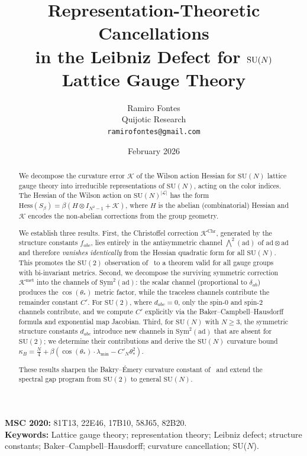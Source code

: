 \documentclass[11pt,a4paper]{article}
\title{Representation-Theoretic Cancellations\\
in the Leibniz Defect for $\SU(N)$\\
Lattice Gauge Theory}
\author{Ramiro Fontes\\
Quijotic Research\\
\texttt{ramirofontes@gmail.com}}
\date{February 2026}
\theoremstyle{plain}
\theoremstyle{definition}
\theoremstyle{remark}
\newcommand{\SU}{\mathrm{SU}}
\newcommand{\Hess}{\mathrm{Hess}}
\newcommand{\ad}{\mathrm{ad}}
\newcommand{\Sym}{\mathrm{Sym}}
\newcommand{\cK}{\mathcal{K}}
\newcommand{\cL}{\mathcal{L}}
\begin{document}
\maketitle

\begin{abstract}
We decompose the curvature error $\cK$ of the Wilson action
Hessian for $\SU(N)$ lattice gauge theory into irreducible
representations of $\SU(N)$, acting on the color indices. The
Hessian of the Wilson action on $\SU(N)^{|\cL|}$ has the form
$\Hess(S_\beta) = \beta(H \otimes I_{N^2-1} + \cK)$, where $H$
is the abelian (combinatorial) Hessian and $\cK$ encodes the
non-abelian corrections from the group geometry.

We establish three results. First, the Christoffel correction
$\cK^{\mathrm{Chr}}$, generated by the structure constants
$f_{abc}$, lies entirely in the antisymmetric channel
$\bigwedge^2(\ad)$ of $\ad \otimes \ad$ and therefore
\emph{vanishes identically} from the Hessian quadratic form for
all $\SU(N)$. This promotes the $\SU(2)$ observation
of~\cite{Fontes2026Paper8} to a theorem valid for all gauge
groups with bi-invariant metrics. Second, we decompose the
surviving symmetric correction $\cK^{\mathrm{met}}$ into the
channels of $\Sym^2(\ad)$: the scalar channel (proportional to
$\delta_{ab}$) produces the $\cos(\theta_*)$ metric factor, while
the traceless channels contribute the remainder constant $C'$.
For $\SU(2)$, where $d_{abc} = 0$, only the spin-$0$ and spin-$2$
channels contribute, and we compute $C'$ explicitly via the
Baker--Campbell--Hausdorff formula and exponential map Jacobian.
Third, for $\SU(N)$ with $N \geq 3$, the symmetric structure
constants $d_{abc}$ introduce new channels in $\Sym^2(\ad)$ that
are absent for $\SU(2)$; we determine their contributions and
derive the $\SU(N)$ curvature bound
$\kappa_B = \frac{N}{4} + \beta(\cos(\theta_*) \cdot
\lambda_{\min} - C'_N\theta_*^2)$.

These results sharpen the Bakry--\'Emery curvature constant
of~\cite{Fontes2026Paper8} and extend the spectral gap program
from $\SU(2)$ to general $\SU(N)$.
\end{abstract}

\medskip
\noindent\textbf{MSC 2020:} 81T13, 22E46, 17B10, 58J65, 82B20.\\
\textbf{Keywords:} Lattice gauge theory; representation theory;
Leibniz defect; structure constants; Baker--Campbell--Hausdorff;
curvature cancellation; SU($N$).

\tableofcontents
\end{document}
